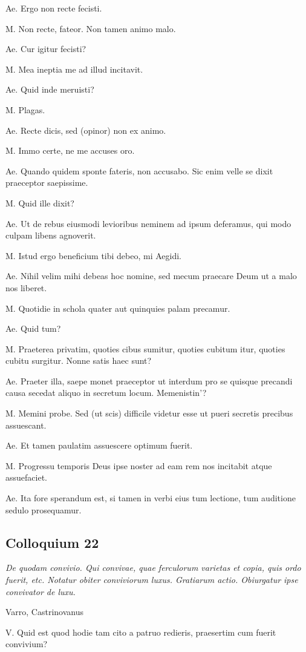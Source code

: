 \documentclass{article}
\begin{document}
Ae. Ergo non recte fecisti.

M. Non recte, fateor. Non tamen animo malo.

Ae. Cur igitur fecisti?

M. Mea ineptia me ad illud incitavit.

Ae. Quid inde meruisti?

M. Plagas.

Ae. Recte dicis, sed (opinor) non ex animo.

M. Immo certe, ne me accuses oro.

Ae. Quando quidem sponte fateris, non accusabo. Sic enim velle se dixit praeceptor saepissime.

M. Quid ille dixit?

Ae. Ut de rebus eiusmodi levioribus neminem ad ipsum deferamus, qui modo culpam libens agnoverit.

M. Istud ergo beneficium tibi debeo, mi Aegidi.

Ae. Nihil velim mihi debeas hoc nomine, sed mecum praecare Deum ut a malo nos liberet.

M. Quotidie in schola quater aut quinquies palam precamur.

Ae. Quid tum?

M. Praeterea privatim, quoties cibus sumitur, quoties cubitum itur, quoties cubitu surgitur. Nonne satis haec sunt?

Ae. Praeter illa, saepe monet praeceptor ut interdum pro se quisque precandi causa secedat aliquo in secretum locum. Memenistin'?

M. Memini probe. Sed (ut scis) difficile videtur esse ut pueri secretis precibus assuescant.

Ae. Et tamen paulatim assuescere optimum fuerit.

M. Progressu temporis Deus ipse noster ad eam rem nos incitabit atque assuefaciet.

Ae. Ita fore sperandum est, si tamen in verbi eius tum lectione, tum auditione sedulo prosequamur.

\subsection{Colloquium 22}
\emph{De quodam convivio. Qui convivae, quae ferculorum varietas et copia, quis ordo fuerit, etc. Notatur obiter conviviorum luxus. Gratiarum actio. Obiurgatur ipse convivator de luxu.}

Varro, Castrinovanus

V. Quid est quod hodie tam cito a patruo redieris, praesertim cum fuerit convivium?
\end{document}
